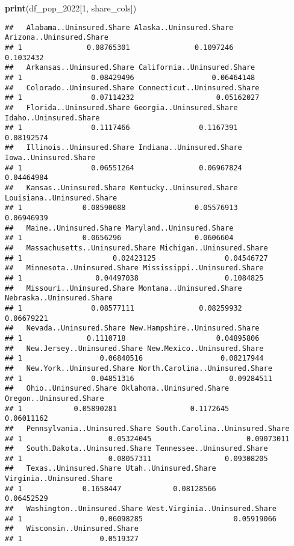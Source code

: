 \documentclass[
]{article}
\newenvironment{Shaded}{\begin{snugshade}}{\end{snugshade}}
\newcommand{\DecValTok}[1]{\textcolor[rgb]{0.00,0.00,0.81}{#1}}
\newcommand{\FunctionTok}[1]{\textcolor[rgb]{0.13,0.29,0.53}{\textbf{#1}}}
\newcommand{\NormalTok}[1]{#1}
\begin{document}
\begin{Shaded}
\begin{Highlighting}[]
\FunctionTok{print}\NormalTok{(df\_pop\_2022[}\DecValTok{1}\NormalTok{, share\_cols])}
\end{Highlighting}
\end{Shaded}

\begin{verbatim}
##   Alabama..Uninsured.Share Alaska..Uninsured.Share Arizona..Uninsured.Share
## 1               0.08765301               0.1097246                0.1032432
##   Arkansas..Uninsured.Share California..Uninsured.Share
## 1                0.08429496                  0.06464148
##   Colorado..Uninsured.Share Connecticut..Uninsured.Share
## 1                0.07114232                   0.05162027
##   Florida..Uninsured.Share Georgia..Uninsured.Share Idaho..Uninsured.Share
## 1                0.1117466                0.1167391             0.08192574
##   Illinois..Uninsured.Share Indiana..Uninsured.Share Iowa..Uninsured.Share
## 1                0.06551264               0.06967824            0.04464984
##   Kansas..Uninsured.Share Kentucky..Uninsured.Share Louisiana..Uninsured.Share
## 1              0.08590088                0.05576913                 0.06946939
##   Maine..Uninsured.Share Maryland..Uninsured.Share
## 1              0.0656296                 0.0606604
##   Massachusetts..Uninsured.Share Michigan..Uninsured.Share
## 1                     0.02423125                0.04546727
##   Minnesota..Uninsured.Share Mississippi..Uninsured.Share
## 1                 0.04497038                    0.1084825
##   Missouri..Uninsured.Share Montana..Uninsured.Share Nebraska..Uninsured.Share
## 1                0.08577111               0.08259932                0.06679221
##   Nevada..Uninsured.Share New.Hampshire..Uninsured.Share
## 1               0.1110718                     0.04895806
##   New.Jersey..Uninsured.Share New.Mexico..Uninsured.Share
## 1                  0.06840516                  0.08217944
##   New.York..Uninsured.Share North.Carolina..Uninsured.Share
## 1                0.04851316                      0.09284511
##   Ohio..Uninsured.Share Oklahoma..Uninsured.Share Oregon..Uninsured.Share
## 1            0.05890281                 0.1172645              0.06011162
##   Pennsylvania..Uninsured.Share South.Carolina..Uninsured.Share
## 1                    0.05324045                      0.09073011
##   South.Dakota..Uninsured.Share Tennessee..Uninsured.Share
## 1                    0.08057311                 0.09308205
##   Texas..Uninsured.Share Utah..Uninsured.Share Virginia..Uninsured.Share
## 1              0.1658447            0.08128566                0.06452529
##   Washington..Uninsured.Share West.Virginia..Uninsured.Share
## 1                  0.06098285                     0.05919066
##   Wisconsin..Uninsured.Share
## 1                  0.0519327
\end{verbatim}
\end{document}
